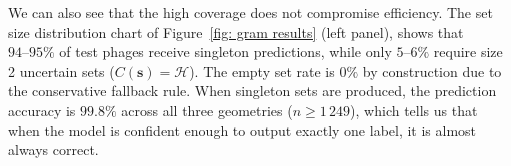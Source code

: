 We can also see that the high coverage does not compromise efficiency. The set size distribution chart of Figure~\ref{fig: 
gram results} (left panel), shows that $94\text{--}95\%$ of test phages receive singleton predictions, while only $5\text
{--}6\%$ require size 2 uncertain sets ($C(\mathbf{s}) = \mathcal{H}$). The empty set rate is $0\%$ by construction due to the 
conservative fallback rule. When singleton sets are produced, the prediction accuracy is $99.8\%$ across all three geometries 
($n \ge 1\,249$), which tells us that when the model is confident enough to output exactly one label, it is almost always correct. 




